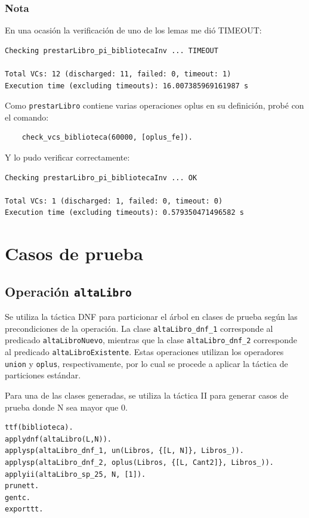 \documentclass{article}
\begin{document}
\subsubsection*{Nota} En una ocasión la verificación de uno de los lemas me dió TIMEOUT:
\begin{verbatim}
Checking prestarLibro_pi_bibliotecaInv ... TIMEOUT

Total VCs: 12 (discharged: 11, failed: 0, timeout: 1)
Execution time (excluding timeouts): 16.007385969161987 s
\end{verbatim}

Como \texttt{prestarLibro} contiene varias operaciones oplus en su definición, probé con el comando:
\begin{verbatim}
    check_vcs_biblioteca(60000, [oplus_fe]).
\end{verbatim}

Y  lo pudo verificar correctamente:
\begin{verbatim}
Checking prestarLibro_pi_bibliotecaInv ... OK

Total VCs: 1 (discharged: 1, failed: 0, timeout: 0)
Execution time (excluding timeouts): 0.579350471496582 s
\end{verbatim}

\section{Casos de prueba}

\subsection*{Operación \texttt{altaLibro}}
Se utiliza la táctica DNF para particionar el árbol en clases de prueba según las precondiciones de la operación. La clase \verb|altaLibro_dnf_1| corresponde al predicado \texttt{altaLibroNuevo}, mientras que la clase \verb|altaLibro_dnf_2| corresponde al predicado \texttt{altaLibroExistente}. Estas operaciones utilizan los operadores \texttt{union} y \texttt{oplus}, respectivamente, por lo cual se procede a aplicar la táctica de particiones estándar.

Para una de las clases generadas, se utiliza la táctica II para generar casos de prueba donde N sea mayor que 0.

\begin{verbatim}
ttf(biblioteca).
applydnf(altaLibro(L,N)).
applysp(altaLibro_dnf_1, un(Libros, {[L, N]}, Libros_)).
applysp(altaLibro_dnf_2, oplus(Libros, {[L, Cant2]}, Libros_)).
applyii(altaLibro_sp_25, N, [1]).
prunett.
gentc.
exporttt.
\end{verbatim}
\end{document}
